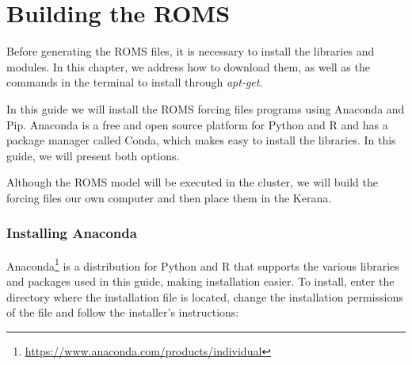 \chapter{Building the ROMS}
\bigskip

\noindent Before generating the ROMS files, it is necessary to install the libraries and modules. 
In this chapter, we address how to download them, as well as the commands in the terminal to install through \textit{apt-get}.
\bigskip

\noindent In this guide we will install the ROMS forcing files programs using Anaconda and Pip. 
Anaconda is a free and open source platform for Python and R and has a package manager called Conda, which makes easy 
to install the libraries. In this guide, we will present both options. 
\bigskip

\begin{tcolorbox}[enhanced,
  grow to left by   = 0cm,
  grow to right by  = 0cm,
  enlarge top by    = 0cm,
  enlarge bottom by = 0cm,
  tcbox raise base,
  boxrule           = 1.0pt,
  left              = 18mm,
  colframe          = red!50!black,coltext=red!25!black,colback=red!10!white,
  overlay           = {\begin{tcbclipinterior}\fill[red!75!blue!50!white] (frame.south west)
    rectangle node[text=white,font=\sffamily\bfseries\footnotesize,rotate=0] {WARNING} ([xshift=18mm]frame.north west);\end{tcbclipinterior}}]
Although the ROMS model will be executed in the cluster, we will build the forcing files our own computer and then place them in the Kerana.
\end{tcolorbox}
\bigskip

\subsection{Installing Anaconda}\label{condasec}
\bigskip
\noindent Anaconda\textcolor{bleu_cite}{\textit{}\footnote{\textcolor{bleu_cite}{\href{https://www.anaconda.com/products/individual}{https://www.anaconda.com/products/individual}}}}
is a distribution for Python and R that supports the various libraries and packages used in this guide, 
making installation easier. To install, enter the directory where the installation file is located, change the installation permissions of the file and 
follow the installer's instructions:
\bigskip

